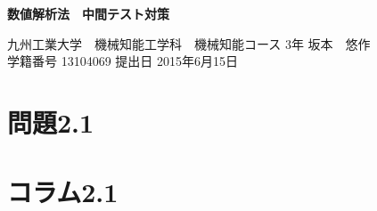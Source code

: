 \documentclass[a4j,twoside,openright,11pt]{jarticle}
\begin{document}
\begin{screen}
\huge
\begin{center}
{\bf 数値解析法　中間テスト対策}\\
\end{center}

\normalsize
\begin{flushright}
九州工業大学　機械知能工学科　機械知能コース 3年 坂本　悠作\\学籍番号 13104069 \hspace{0.2in}提出日 2015年6月15日
\end{flushright}
\end{screen}

\section{問題2.1}

\section{コラム2.1}
\end{document}
